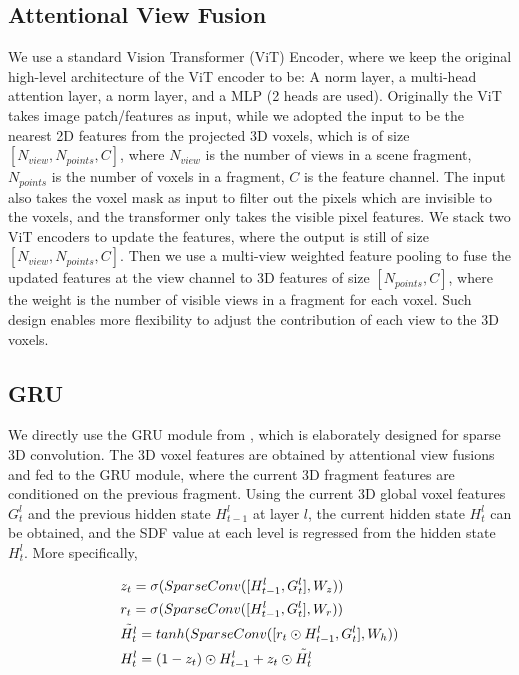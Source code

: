 \subsection{Attentional View Fusion}
We use a standard Vision Transformer (ViT) Encoder, where we keep the original high-level architecture of the ViT encoder to be: A norm layer, a multi-head attention layer, a norm layer, and a MLP (2 heads are used). Originally the ViT takes image patch/features as input, while we adopted the input to be the nearest 2D features from the projected 3D voxels, which is of size $[N_{view}, N_{points}, C]$, where $N_{view}$ is the number of views in a scene fragment, $N_{points}$ is the number of voxels in a fragment, $C$ is the feature channel. The input also takes the voxel mask as input to filter out the pixels which are invisible to the voxels, and the transformer only takes the visible pixel features. We stack two ViT encoders to update the features, where the output is still of size $[N_{view}, N_{points}, C]$. Then we use a multi-view weighted feature pooling to fuse the updated features at the view channel to 3D features of size $[N_{points}, C]$, where the weight is the number of visible views in a fragment for each voxel. Such design enables more flexibility to adjust the contribution of each view to the 3D voxels. 

\subsection{GRU}
We directly use the GRU module from \cite{neucon}, which is elaborately designed for sparse 3D convolution. The 3D voxel features are obtained by attentional view fusions and fed to the GRU module, where the current 3D fragment features are conditioned on the previous fragment. Using the current 3D global voxel features $G^l_{t}$ and the previous hidden state $H^l_{t-1}$ at layer $l$,  the current hidden state $H^l_{t}$ can be obtained, and the SDF value at each level is regressed from the hidden state $H^l_{t}$. More specifically,

\begin{equation}
\begin{aligned}
     &z_t = \sigma(SparseConv([H^{l}_{t-1}, G^l_t], W_z)) \\
     &r_t = \sigma(SparseConv([H^{l}_{t-1}, G^l_t], W_r)) \\
     &\Tilde{H^l_t} = tanh(SparseConv([r_t \odot H^l_{t-1}, G^l_t], W_h)) \\
     &H^l_t = (1-z_t)\odot H^l_{t-1} + z_{t} \odot \Tilde{H^l_t}
\end{aligned}
\end{equation}

